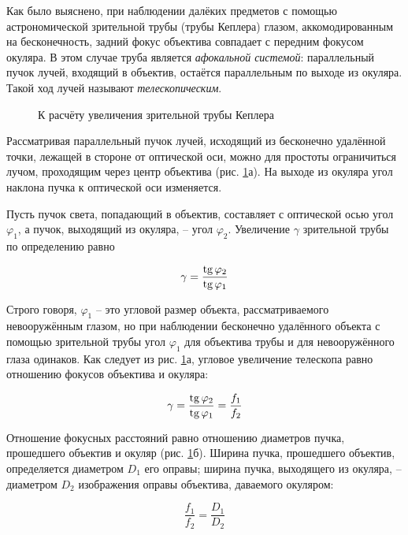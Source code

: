 Как было выяснено, при наблюдении далёких предметов с помощью астрономической
зрительной трубы (трубы Кеплера) глазом, аккомодированным на бесконечность, задний фокус 
объектива совпадает с передним фокусом окуляра. В этом случае труба является \textit{афокальной 
системой}: параллельный пучок лучей, входящий в объектив, остаётся параллельным по выходе
из окуляра. Такой ход лучей называют \textit{телескопическим}.

\begin{figure}[h]
  \caption{К расчёту увеличения зрительной трубы Кеплера}
  \label{img::4}
\end{figure}

Рассматривая параллельный пучок лучей, исходящий из бесконечно удалённой точки, лежащей 
в стороне от оптической оси, можно для простоты ограничиться лучом, проходящим через 
центр объектива (рис. \ref{img::4}а). На выходе из окуляра угол наклона пучка к оптической 
оси изменяется.

Пусть пучок света, попадающий в объектив, составляет с оптической осью угол $\varphi_1$, 
а пучок, выходящий из окуляра, -- угол $\varphi_2$. Увеличение $\gamma$ зрительной трубы по 
определению равно

\begin{equation}\label{eq::1}
  \gamma = \frac{\mathop{\mathrm{tg}}\nolimits \varphi_2}{\mathop{\mathrm{tg}}\nolimits \varphi_1}
\end{equation}

Строго говоря, $\varphi_1$ -- это угловой размер объекта, рассматриваемого невооружённым 
глазом, но при наблюдении бесконечно удалённого объекта с помощью зрительной трубы угол
$\varphi_1$ для объектива трубы и для невооружённого глаза одинаков. Как следует из 
рис. \ref{img::4}а, угловое увеличение телескопа равно отношению фокусов объектива и окуляра:

\begin{equation}\label{eq::2}
  \gamma = \frac{\mathop{\mathrm{tg}}\nolimits \varphi_2}{\mathop{\mathrm{tg}}\nolimits \varphi_1} = \frac{f_1}{f_2}
\end{equation}

Отношение фокусных расстояний равно отношению диаметров пучка, прошедшего объектив и 
окуляр (рис. \ref{img::4}б). Ширина пучка, прошедшего объектив, определяется диаметром $D_1$ 
его оправы; ширина пучка, выходящего из окуляра, -- диаметром $D_2$ изображения оправы
объектива, даваемого окуляром:

\begin{equation}\label{eq::3}
  \frac{f_1}{f_2} = \frac{D_1}{D_2}
\end{equation}

